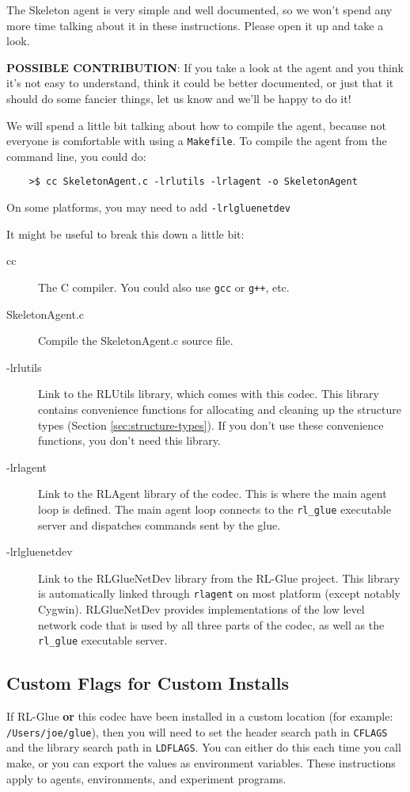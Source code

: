 \documentclass[11pt]{article}
\begin{document}
The Skeleton agent is very simple and well documented, so we won't spend any more time talking about it in these instructions.
Please open it up and take a look.

\textbf{POSSIBLE CONTRIBUTION}: If you take a look at the agent and you think it's not easy to understand, think it could be better documented, 
or just that it should do some fancier things, let us know and we'll be happy to do it!

We will spend a little bit talking about how to compile the agent, because not everyone is comfortable with using a \texttt{Makefile}.  To compile
the agent from the command line, you could do:
\begin{verbatim}
	>$ cc SkeletonAgent.c -lrlutils -lrlagent -o SkeletonAgent
\end{verbatim}

On some platforms, you may need to add \texttt{-lrlgluenetdev}

It might be useful to break this down a little bit:
\begin{description}
\item [cc] The C compiler.  You could also use \texttt{gcc} or \texttt{g++}, etc.
\item [SkeletonAgent.c] Compile the SkeletonAgent.c source file.
\item [-lrlutils] Link to the RLUtils library, which comes with this codec.  This library contains convenience functions for allocating and cleaning up the structure types (Section \ref{sec:structure-types}).  If you 
don't use these convenience functions, you don't need this library.
\item [-lrlagent] Link to the RLAgent library of the codec.  This is where the main agent loop is defined. The main agent loop connects to the \texttt{rl\_glue} executable server and dispatches commands sent by the glue.
\item [-lrlgluenetdev] Link to the RLGlueNetDev library from the RL-Glue project.  This library is automatically linked through \texttt{rlagent} on most platform (except notably Cygwin).  
RLGlueNetDev provides implementations of the low level network code that is used by all three parts of the codec, as well as the \texttt{rl\_glue} executable server.
\end{description}

\subsection{Custom Flags for Custom Installs}
\label{sec:custom-flags}
If RL-Glue \textbf{or} this codec have been installed in a custom location (for example: \texttt{/Users/joe/glue}), then you will
need to set the header search path in \texttt{CFLAGS} and the library search path in \texttt{LDFLAGS}.  You can either do this each time you call make, 
or you can export the values as environment variables.  These instructions apply to agents, environments, and experiment programs.
\end{document}
